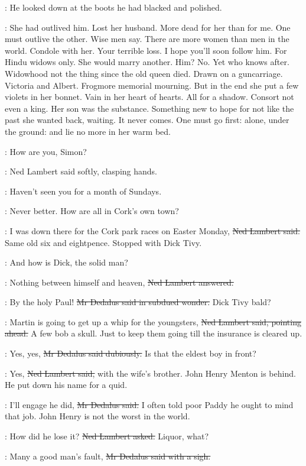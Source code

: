 :
He looked down at the boots he had blacked and polished.

\BloomInt:
She had outlived him.
Lost her husband.
More dead for her than for me.
One must outlive the other.
Wise men say.
There are more women than men in the world.
Condole with her.
Your terrible loss.
I hope you'll soon follow him.
For Hindu widows only.
She would marry another.
Him?
No.
Yet who knows after.
Widowhood not the thing since the old queen died.
Drawn on a guncarriage.
Victoria and Albert.
Frogmore memorial mourning.
But in the end she put a few violets in her bonnet.
Vain in her heart of hearts.
All for a shadow.
Consort not even a king.
Her son was the substance.
Something new to hope for not like the past she wanted back, waiting.
It never comes.
One must go first:
alone, under the ground:
and lie no more in her warm bed.

\lambert:
How are you, Simon?

:
Ned Lambert said softly,
clasping hands.

\lambert:
Haven't seen you for a month of Sundays.

\simon:
Never better.
How are all in Cork's own town?

\lambert:
I was down there for the Cork park races on Easter Monday,
\sout{Ned Lambert said.}
Same old six and eightpence.
Stopped with Dick Tivy.

\simon:
And how is Dick, the solid man?

\lambert:
Nothing between himself and heaven,
\sout{Ned Lambert answered.}

\simon:
By the holy Paul!
\sout{Mr Dedalus said in subdued wonder.}
Dick Tivy bald?

\lambert:
Martin is going to get up a whip for the youngsters,
\sout{Ned Lambert said, pointing ahead.}
A few bob a skull.
Just to keep them going till the insurance is cleared up.

\simon:
Yes, yes,
\sout{Mr Dedalus said dubiously.}
Is that the eldest boy in front?

\lambert:
Yes,
\sout{Ned Lambert said,}
with the wife's brother.
John Henry Menton is behind.
He put down his name for a quid.

\simon:
I'll engage he did,
\sout{Mr Dedalus said.}
I often told poor Paddy he ought to mind that job.
John Henry is not the worst in the world.

\lambert:
How did he lose it?
\sout{Ned Lambert asked.}
Liquor, what?

\simon:
Many a good man's fault,
\sout{Mr Dedalus said with a sigh.}

